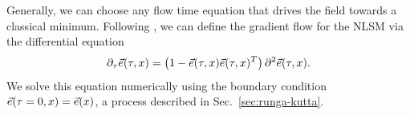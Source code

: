 Generally, we can choose any flow time equation that drives the field towards a classical minimum. Following \cite{bietenholz2018}, we can define the gradient flow for the NLSM via the differential equation
\begin{equation}
    \label{eq:nsm_gradflow}
  \partial_\tau \vec e (\tau,x) = \left( 1 - \vec e(\tau,x) \vec e(\tau,x)^T \right) \partial^2 \vec e(\tau,x).
\end{equation}
We solve this equation numerically using the boundary condition $\vec e(\tau=0,x) = \vec e(x)$, a process described in Sec.~\ref{sec:runga-kutta}.

